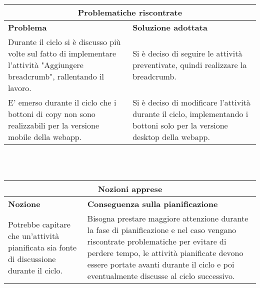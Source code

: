\documentclass[a4paper, 12pt]{article}
\begin{document}
\begin{center}
    \begin{tabularx}{\textwidth}{|X|X|}
        \hline
        \multicolumn{2}{|c|}{\textbf{Problematiche riscontrate}}\\
        \hline
        \hline
        \textbf{Problema} & \textbf{Soluzione adottata}\\
        \hline
        Durante il ciclo si è discusso più volte sul fatto di implementare l'attività "Aggiungere breadcrumb", rallentando il lavoro. & Si è deciso di seguire le attività preventivate, quindi realizzare la breadcrumb. \\
        \hline
        E' emerso durante il ciclo che i bottoni di copy non sono realizzabili per la versione mobile della webapp. & Si è deciso di modificare l'attività durante il ciclo, implementando i bottoni solo per la versione desktop della webapp. \\
        \hline
    \end{tabularx}\\[8pt]
    \mbox{}\\
\end{center}

\begin{center}
    \begin{tabularx}{\textwidth}{|X|X|}
        \hline
        \multicolumn{2}{|c|}{\textbf{Nozioni apprese}}\\
        \hline
        \hline
        \textbf{Nozione} & \textbf{Conseguenza sulla pianificazione}\\
        \hline
        Potrebbe capitare che un'attività pianificata sia fonte di discussione durante il ciclo. & Bisogna prestare maggiore attenzione durante la fase di pianificazione e nel caso vengano riscontrate problematiche per evitare di perdere tempo, le attività pianificate devono essere portate avanti durante il ciclo e poi eventualmente discusse al ciclo successivo. \\
        \hline
    \end{tabularx}\\[8pt]
    \mbox{}\\
\end{center}
\end{document}
